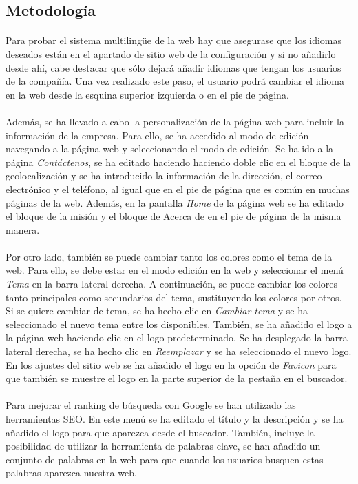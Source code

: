 \subsection{Metodología}
\paragraph{}
Para probar el sistema multilingüe de la web hay que asegurase que los idiomas deseados están en el apartado de sitio web de la configuración y si no añadirlo desde ahí, cabe destacar que sólo dejará añadir idiomas que tengan los usuarios de la compañía. Una vez realizado este paso, el usuario podrá cambiar el idioma en la web desde la esquina superior izquierda o en el pie de página. 
\paragraph{}
Además, se ha llevado a cabo la personalización de la página web para incluir la información de la empresa. Para ello, se ha accedido al modo de edición navegando a la página web y seleccionando el modo de edición. Se ha ido a la página \textit{Contáctenos}, se ha editado haciendo haciendo doble clic en el bloque de la geolocalización y se ha introducido la información de la dirección, el correo electrónico y el teléfono, al igual que en el pie de página que es común en muchas páginas de la web. Además, en la pantalla \textit{Home} de la página web se ha editado el bloque de la misión y el bloque de Acerca de en el pie de página de la misma manera. 
\paragraph{}
Por otro lado, también se puede cambiar tanto los colores como el tema de la web. Para ello, se debe estar en el modo edición en la web y seleccionar el menú \textit{Tema} en la barra lateral derecha. A continuación, se puede cambiar los colores tanto principales como secundarios del tema, sustituyendo los colores por otros. Si se quiere cambiar de tema, se ha hecho clic en \textit{Cambiar tema} y se ha seleccionado el nuevo tema entre los disponibles. También, se ha añadido el logo a la página web haciendo clic en el logo predeterminado. Se ha desplegado la barra lateral derecha, se ha hecho clic en \textit{Reemplazar} y se ha seleccionado el nuevo logo. En los ajustes del sitio web se ha añadido el logo en la opción de \textit{Favicon} para que también se muestre el logo en la parte superior de la pestaña en el buscador. 
\paragraph{}
Para mejorar el ranking de búsqueda con Google se han utilizado las herramientas SEO. En este menú se ha editado el título y la descripción y se ha añadido el logo para que aparezca desde el buscador. También, incluye la posibilidad de utilizar la herramienta de palabras clave, se han añadido un conjunto de palabras en la web para que cuando los usuarios busquen estas palabras aparezca nuestra web.

